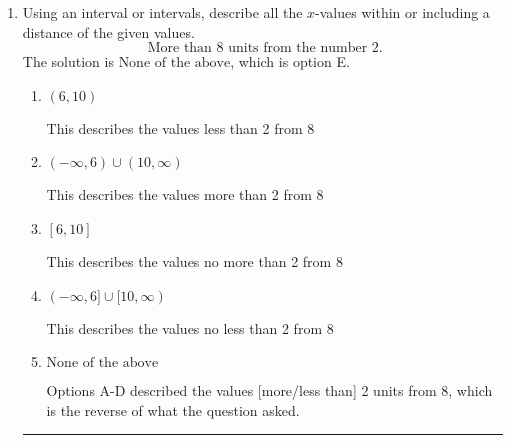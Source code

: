 \documentclass{extbook}[14pt]
\newcommand{\litem}[1]{\item #1

\rule{\textwidth}{0.4pt}}
\begin{document}
\begin{enumerate}
{\begin{enumerate}[label=\Alph*.]
* $(-\infty, -1.532)$, which is the correct option.
\item \( (a, \infty), \text{ where } a \in [1.53, 2.53] \)

 $(1.532, \infty)$, which corresponds to switching the direction of the interval AND negating the endpoint. You likely did this if you did not flip the inequality when dividing by a negative as well as not moving values over to a side properly.
\item \( (-\infty, a), \text{ where } a \in [0.53, 3.53] \)

 $(-\infty, 1.532)$, which corresponds to negating the endpoint of the solution.
\item \( (a, \infty), \text{ where } a \in [-2.53, 0.47] \)

 $(-1.532, \infty)$, which corresponds to switching the direction of the interval. You likely did this if you did not flip the inequality when dividing by a negative!
\item \( \text{None of the above}. \)

You may have chosen this if you thought the inequality did not match the ends of the intervals.
\end{enumerate}

\textbf{General Comment:} Remember that less/greater than or equal to includes the endpoint, while less/greater do not. Also, remember that you need to flip the inequality when you multiply or divide by a negative.
}
\litem{
Using an interval or intervals, describe all the $x$-values within or including a distance of the given values.
\[ \text{ More than } 8 \text{ units from the number } 2. \]
The solution is \( \text{None of the above} \), which is option E.\begin{enumerate}[label=\Alph*.]
\item \( (6, 10) \)

This describes the values less than 2 from 8
\item \( (-\infty, 6) \cup (10, \infty) \)

This describes the values more than 2 from 8
\item \( [6, 10] \)

This describes the values no more than 2 from 8
\item \( (-\infty, 6] \cup [10, \infty) \)

This describes the values no less than 2 from 8
\item \( \text{None of the above} \)

Options A-D described the values [more/less than] 2 units from 8, which is the reverse of what the question asked.
\end{enumerate}

}
\end{enumerate}
\end{document}
